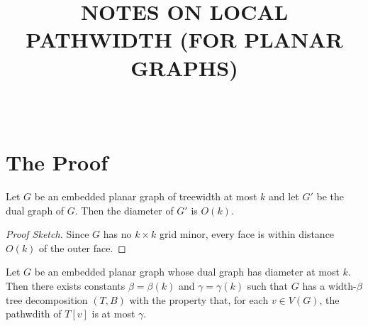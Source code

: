 \documentclass{patmorin}
\title{\MakeUppercase{Notes on Local Pathwidth (for Planar Graphs)}}
\author{\ } %
\begin{document}
\maketitle

\section{The Proof}

\begin{lem}
   Let $G$ be an embedded planar graph of treewidth at most $k$ and let
   $G'$ be the dual graph of $G$.  Then the diameter of $G'$ is $O(k)$.
\end{lem}

\begin{proof}[Proof Sketch]
   Since $G$ has no $k\times k$ grid minor, every face is within distance
   $O(k)$ of the outer face.
\end{proof}


\begin{lem}
  Let $G$ be an embedded planar graph whose dual graph has diameter at most
  $k$. Then there exists constants $\beta=\beta(k)$ and $\gamma=\gamma(k)$
  such that $G$ has a width-$\beta$ tree decomposition $(T,B)$ with
  the property that, for each $v\in V(G)$, the pathwdith of $T[v]$
  is at most $\gamma$.
\end{lem}
\end{document}
